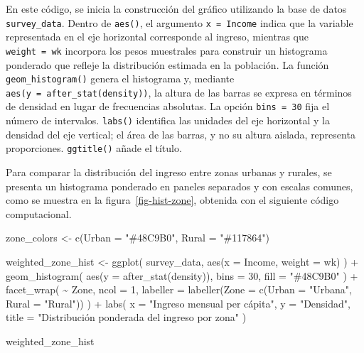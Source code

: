 \documentclass[
  spanish,
  11pt,
  letterpaper,
  oneside,
  open=any]{scrbook}
\newenvironment{Shaded}{\begin{snugshade}}{\end{snugshade}}
\newcommand{\AttributeTok}[1]{\textcolor[rgb]{0.40,0.45,0.13}{#1}}
\newcommand{\DecValTok}[1]{\textcolor[rgb]{0.68,0.00,0.00}{#1}}
\newcommand{\FunctionTok}[1]{\textcolor[rgb]{0.28,0.35,0.67}{#1}}
\newcommand{\NormalTok}[1]{\textcolor[rgb]{0.00,0.23,0.31}{#1}}
\newcommand{\OtherTok}[1]{\textcolor[rgb]{0.00,0.23,0.31}{#1}}
\newcommand{\SpecialCharTok}[1]{\textcolor[rgb]{0.37,0.37,0.37}{#1}}
\newcommand{\StringTok}[1]{\textcolor[rgb]{0.13,0.47,0.30}{#1}}
\begin{document}
En este código, se inicia la construcción del gráfico utilizando la base
de datos \texttt{survey\_data}. Dentro de \texttt{aes()}, el argumento
\texttt{x\ =\ Income} indica que la variable representada en el eje
horizontal corresponde al ingreso, mientras que \texttt{weight\ =\ wk}
incorpora los pesos muestrales para construir un histograma ponderado
que refleje la distribución estimada en la población. La función
\texttt{geom\_histogram()} genera el histograma y, mediante
\texttt{aes(y\ =\ after\_stat(density))}, la altura de las barras se
expresa en términos de densidad en lugar de frecuencias absolutas. La
opción \texttt{bins\ =\ 30} fija el número de intervalos.
\texttt{labs()} identifica las unidades del eje horizontal y la densidad
del eje vertical; el área de las barras, y no su altura aislada,
representa proporciones. \texttt{ggtitle()} añade el título.

Para comparar la distribución del ingreso entre zonas urbanas y rurales,
se presenta un histograma ponderado en paneles separados y con escalas
comunes, como se muestra en la figura~\ref{fig-hist-zone}, obtenida con
el siguiente código computacional.

\begin{Shaded}
\begin{Highlighting}[]
\NormalTok{zone\_colors }\OtherTok{\textless{}{-}} \FunctionTok{c}\NormalTok{(}\AttributeTok{Urban =} \StringTok{"\#48C9B0"}\NormalTok{, }\AttributeTok{Rural =} \StringTok{"\#117864"}\NormalTok{)}

\NormalTok{weighted\_zone\_hist }\OtherTok{\textless{}{-}} \FunctionTok{ggplot}\NormalTok{(}
\NormalTok{  survey\_data,}
  \FunctionTok{aes}\NormalTok{(}\AttributeTok{x =}\NormalTok{ Income, }\AttributeTok{weight =}\NormalTok{ wk)}
\NormalTok{) }\SpecialCharTok{+}
  \FunctionTok{geom\_histogram}\NormalTok{(}
    \FunctionTok{aes}\NormalTok{(}\AttributeTok{y =} \FunctionTok{after\_stat}\NormalTok{(density)),}
    \AttributeTok{bins =} \DecValTok{30}\NormalTok{,}
    \AttributeTok{fill =} \StringTok{"\#48C9B0"}
\NormalTok{  ) }\SpecialCharTok{+}
  \FunctionTok{facet\_wrap}\NormalTok{(}
    \SpecialCharTok{\textasciitilde{}}\NormalTok{ Zone,}
    \AttributeTok{ncol =} \DecValTok{1}\NormalTok{,}
    \AttributeTok{labeller =} \FunctionTok{labeller}\NormalTok{(}\AttributeTok{Zone =} \FunctionTok{c}\NormalTok{(}\AttributeTok{Urban =} \StringTok{"Urbana"}\NormalTok{, }\AttributeTok{Rural =} \StringTok{"Rural"}\NormalTok{))}
\NormalTok{  ) }\SpecialCharTok{+}
  \FunctionTok{labs}\NormalTok{(}
    \AttributeTok{x =} \StringTok{"Ingreso mensual per cápita"}\NormalTok{,}
    \AttributeTok{y =} \StringTok{"Densidad"}\NormalTok{,}
    \AttributeTok{title =} \StringTok{"Distribución ponderada del ingreso por zona"}
\NormalTok{  )}

\NormalTok{weighted\_zone\_hist}
\end{Highlighting}
\end{Shaded}
\end{document}

